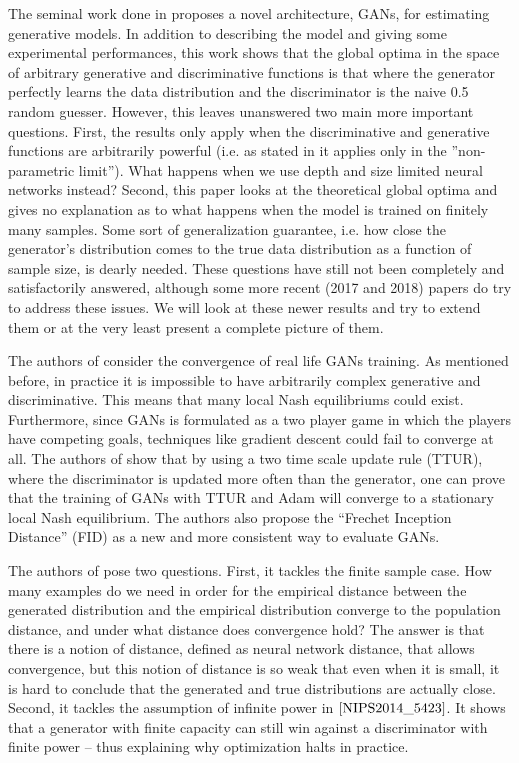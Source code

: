 \documentclass[11pt]{hw-template}
\begin{document}
\maketitle

The seminal work done in \cite{NIPS2014_5423} proposes a novel architecture, GANs, for estimating generative models. In addition to describing the model and giving some experimental performances,
this work shows that the global optima in the space of arbitrary generative and discriminative functions is that where the generator perfectly learns the data distribution and the discriminator is
the naive 0.5 random guesser. However, this leaves unanswered two main more important questions. First, the results only apply when the discriminative and generative functions are arbitrarily powerful
(i.e. as stated in \cite{NIPS2014_5423} it applies only in the ''non-parametric limit''). What happens when we use depth and size limited neural networks instead? Second, this paper looks at the
theoretical global optima and gives no explanation as to what happens when the model is trained on finitely many samples. Some sort of generalization guarantee, i.e. how close the generator's distribution
comes to the true data distribution as a function of sample size, is dearly needed. These questions have still not been completely and satisfactorily answered, although some more recent (2017 and 2018) papers
do try to address these issues. We will look at these newer results and try to extend them or at the very least present a complete picture of them.

The authors of \cite{NIPS2017_7240} consider the convergence of real life GANs training. As mentioned before, in practice it is impossible to have arbitrarily complex generative and discriminative. This means
that many local Nash equilibriums could exist. Furthermore, since GANs is formulated as a two player game in which the players have competing goals, techniques like gradient descent could fail to converge at all.
The authors of \cite{NIPS2017_7240} show that by using a two time scale update rule (TTUR), where the discriminator is updated more often than the generator, one can prove that the training of GANs
with TTUR and Adam will converge to
a stationary local Nash equilibrium. The authors also propose the ``Frechet Inception Distance'' (FID) as a new and more consistent way to evaluate GANs.

The authors of \cite{arora2017generalization} pose two questions. First, it tackles the finite sample case. How many examples do we need in order for the empirical distance between the
generated distribution and the empirical distribution converge to the population distance, and
under what distance does convergence hold? The answer is that there is a notion of distance, defined as neural network distance, that allows convergence, but this notion
of distance is so weak that even when it is small, it is hard to conclude that the generated and true distributions are actually close.
Second, it tackles the assumption of infinite power in $\cite{NIPS2014_5423}$. It shows that a generator with finite capacity can
still win against a discriminator with finite power -- thus explaining why optimization halts in practice.
\end{document}
